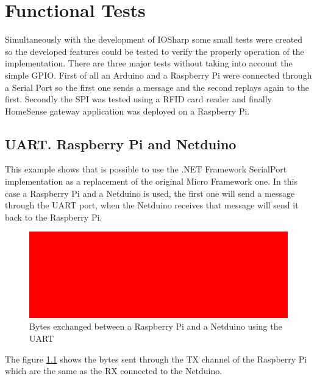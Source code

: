 \chapter{Functional Tests}\label{C:Functional-Tests}
Simultaneously with the development of IOSharp some small tests were created so the developed features could be tested to verify the properly operation of the implementation. There are three major tests without taking into account the simple GPIO. First of all an Arduino and a Raspberry Pi were connected through a Serial Port so the first one sends a message and the second replays again to the first. Secondly the SPI was tested using a RFID card reader and finally HomeSense gateway application was deployed on a Raspberry Pi.

\section{UART. Raspberry Pi and Netduino}\label{S:IOEx-UART}
This example shows that is possible to use the .NET Framework SerialPort implementation as a replacement of the original Micro Framework one. In this case a Raspberry Pi and a Netduino is used, the first one will send a message through the UART port, when the Netduino receives that message will send it back to the Raspberry Pi.
\begin{figure}[H]\begin{center}
 \centering
  \captionsetup{justification=centering}
  \includegraphics[width=1\textwidth]{pictures/sample/red}
  \caption{Bytes exchanged between a Raspberry Pi and a Netduino using the UART \label{fig:IOEx-UART}}
\end{center}\end{figure}

The figure \ref{fig:IOEx-UART} shows the bytes sent through the \gls{TX} channel of the Raspberry Pi which are the same as the \gls{RX} connected to the Netduino.

